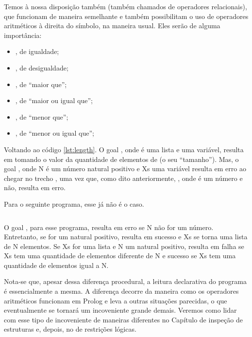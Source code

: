 \documentclass{article}
\begin{document}
\inputminted{prolog}{../Exemplos/Cap6/prog3_xor.pl}\label{lst:xor}

Temos à nossa disposição também  (também chamados de operadores relacionais), que funcionam de
maneira semelhante e também possibilitam o uso de operadores aritméticos à direita do símbolo, na maneira usual. Eles serão de
alguma importância:

\begin{itemize}
  \item {}, de igualdade;
  \item {}, de desigualdade;
  \item {}, de ``maior que'';
  \item {}, de ``maior ou igual que'';
  \item {}, de ``menor que'';
  \item {}, de ``menor ou igual que'';
\end{itemize}



Voltando ao código \ref{lst:length}.
O goal , onde  é uma lista e  uma variável, resulta em  tomando o valor da quantidade de elementos de  (o seu ``tamanho'').  Mas, o goal , onde N é um número natural positivo e Xs uma variável resulta em erro ao chegar no trecho , uma vez que, como dito anteriormente, , onde  é um número e  não, resulta em erro.

Para o seguinte programa, esse já não é o caso.

\inputminted{prolog}{../Exemplos/Cap3/prog3_length2.pl}\label{lst:length2}

O goal , para esse programa, resulta em erro se N não for um número. Entretanto, se for um natural positivo,  resulta em sucesso e Xs se torna uma lista de N elementos. Se Xs for uma lista e N um natural positivo,  resulta em falha se Xs tem uma quantidade de elementos diferente de N e sucesso se Xs tem uma quantidade de elementos igual a N.

Nota-se que, apesar dessa diferença procedural, a leitura declarativa do programa é essencialmente a mesma. A diferença decorre da maneira como os operadores aritméticos funcionam em Prolog e leva a outras situações parecidas, o que eventualmente se tornará um incoveniente grande demais. Veremos como lidar com esse tipo de incoveniente de maneiras diferentes no Capítulo de inspeção de estruturas %
e, depois, no de restrições lógicas. %
\end{document}
